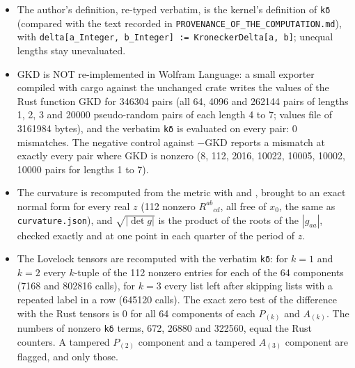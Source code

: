 \documentclass[11pt]{article}
\begin{document}
\begin{itemize}
\item The author's definition, re-typed verbatim, is the kernel's definition of \texttt{kδ} (compared with the text recorded in \texttt{PROVENAN\allowbreak{}CE\_OF\_TH\allowbreak{}E\_COMPUT\allowbreak{}ATION.md}), with \texttt{delta[a\_\allowbreak{}Integer,\allowbreak{} b\_Integ\allowbreak{}er] := K\allowbreak{}ronecker\allowbreak{}Delta[a,\allowbreak{} b]}; unequal lengths stay unevaluated.
\item GKD is NOT re-implemented in Wolfram Language: a small exporter compiled with cargo against the unchanged crate writes the values of the Rust function GKD for 346304 pairs (all 64, 4096 and 262144 pairs of lengths 1, 2, 3 and 20000 pseudo-random pairs of each length 4 to 7; values file of 3161984 bytes), and the verbatim \texttt{kδ} is evaluated on every pair: 0 mismatches. The negative control against $-$GKD reports a mismatch at exactly every pair where GKD is nonzero (8, 112, 2016, 10022, 10005, 10002, 10000 pairs for lengths 1 to 7).
\item The curvature is recomputed from the metric with \texttt{} and \texttt{}, brought to an exact normal form for every real $z$ (112 nonzero $R^{ab}{}_{cd}$, all free of $x_0$, the same as \texttt{curvatur\allowbreak{}e.json}), and $\sqrt{|\det g|}$ is the product of the roots of the $|g_{aa}|$, checked exactly and at one point in each quarter of the period of $z$.
\item The Lovelock tensors are recomputed with the verbatim \texttt{kδ}: for $k = 1$ and $k = 2$ every $k$-tuple of the 112 nonzero entries for each of the 64 components (7168 and 802816 calls), for $k = 3$ every list left after skipping lists with a repeated label in a row (645120 calls). The exact zero test of the difference with the Rust tensors is 0 for all 64 components of each $P_{(k)}$ and $A_{(k)}$. The numbers of nonzero \texttt{kδ} terms, 672, 26880 and 322560, equal the Rust counters. A tampered $P_{(2)}$ component and a tampered $A_{(3)}$ component are flagged, and only those.
\end{itemize}
\end{document}
